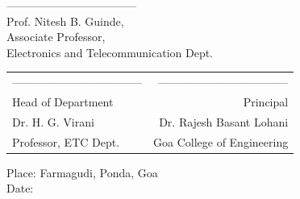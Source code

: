 \noindent -----------------------------------\\
Prof. Nitesh B. Guinde,\\
Associate Professor,\\
Electronics and Telecommunication Dept.\\



\begin{table}[H]
\begin{tabular}{lr}
\noindent ----------------------------------- & \hspace{6cm} ----------------------------------- \\
Head of Department & Principal\\
Dr. H. G. Virani & Dr. Rajesh Basant Lohani\\
Professor, ETC Dept. & Goa College of Engineering\\
\end{tabular}
\end{table}
\vspace{-0.5cm}
\noindent Place: Farmagudi, Ponda, Goa\\
\noindent Date:
